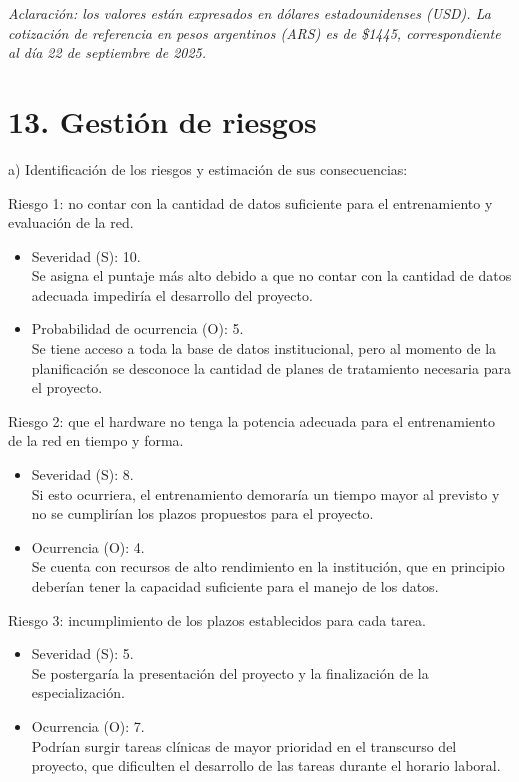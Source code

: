 \documentclass[
11pt, %
codirector, %
]{charter}
\begin{document}
\textit{Aclaración: los valores están expresados en dólares estadounidenses (USD). La cotización de referencia en pesos argentinos (ARS) es de \$1445, correspondiente al día 22 de septiembre de 2025.}

\section{13. Gestión de riesgos}
\label{sec:riesgos}

a) Identificación de los riesgos y estimación de sus consecuencias:
 
Riesgo 1: no contar con la cantidad de datos suficiente para el entrenamiento y evaluación de la red.
\begin{itemize}
	\item Severidad (S): 10.\\
	Se asigna el puntaje más alto debido a que no contar con la cantidad de datos adecuada impediría el desarrollo del proyecto.
	\item Probabilidad de ocurrencia (O): 5.\\
	Se tiene acceso a toda la base de datos institucional, pero al momento de la planificación se desconoce la cantidad de planes de tratamiento necesaria para el proyecto. 
\end{itemize}   

Riesgo 2: que el hardware no tenga la potencia adecuada para el entrenamiento de la red en tiempo y forma.
\begin{itemize}
	\item Severidad (S): 8.\\
	Si esto ocurriera, el entrenamiento demoraría un tiempo mayor al previsto y no se cumplirían los plazos propuestos para el proyecto.
	\item Ocurrencia (O): 4.\\
	Se cuenta con recursos de alto rendimiento en la institución, que en principio deberían tener la capacidad suficiente para el manejo de los datos.
\end{itemize}

\newpage
Riesgo 3: incumplimiento de los plazos establecidos para cada tarea. 
\begin{itemize}
	\item Severidad (S):  5.\\
	Se postergaría la presentación del proyecto y la finalización de la especialización. 
	\item Ocurrencia (O): 7.\\
	Podrían surgir tareas clínicas de mayor prioridad en el transcurso del proyecto, que dificulten el desarrollo de las tareas durante el horario laboral. 
\end{itemize}
\end{document}
